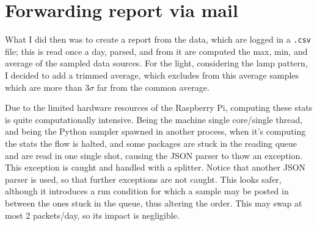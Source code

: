 \documentclass[11pt]{article}
\begin{document}
\section{Forwarding report via mail}
What I did then was to create a report from the data, which are logged in a \texttt{.csv} file; this is read once a day, parsed, and from it are computed the max, min, and average of the sampled data sources. For the light, considering the lamp pattern, I decided to add a trimmed average, which excludes from this average samples which are more than $3\sigma$ far from the common average. 

Due to the limited hardware resources of the Raspberry Pi, computing these stats is quite computationally intensive. Being the machine single core/single thread, and being the Python sampler spawned in another process, when it's computing the stats the flow is halted, and some packages are stuck in the reading queue and are read in one single shot, causing the JSON parser to thow an exception. This exception is caught and handled with a splitter. Notice that another JSON parser is used, so that further exceptions are not caught. This looks safer, although it introduces a run condition for which a sample may be posted in between the ones stuck in the queue, thus altering the order. This may swap at most 2 packets/day, so its impact is negligible.
\end{document}
